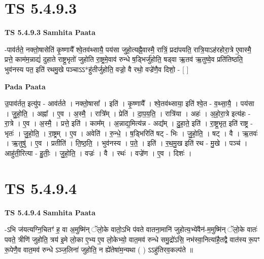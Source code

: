\documentclass[17pt]{extarticle}
\begin{document}
\section*{ TS 5.4.9.3 }

\textbf{TS 5.4.9.3 } \newline
\textbf{Samhita Paata} \newline

-पाव॑र्तते॒ नक्तो॒षासेति॑ कृ॒ष्णायै᳚ श्वे॒तव॑थ्सायै॒ पय॑सा जुहो॒त्यह्नै॒वास्मै॒ रात्रिं॒ प्रदा॑पयति॒ रात्रि॒याऽह॑रहोरा॒त्रे ए॒वास्मै॒ प्रत्ते॒ काम॑म॒न्नाद्यं॑ दुहाते राष्ट्र॒भृतो॑ जुहोति रा॒ष्ट्रमे॒वाव॑ रुन्धे ष॒ड्भिर्जु॑होति॒ षड्वा ऋ॒तव॑ ऋ॒तुष्वे॒व प्रति॑तिष्ठति॒ भुव॑नस्य पत॒ इति॑ रथमु॒खे पञ्चाऽऽ*हु॑तीर्जुहोति॒ वज्रो॒ वै रथो॒ वज्रे॑णै॒व दिशो॒ - [  ] \newline

\textbf{Pada Paata} \newline

उ॒पाव॑र्तत॒ इत्यु॑प - आव॑र्तते । नक्तो॒षासा᳚ । इति॑ । कृ॒ष्णायै᳚ । श्वे॒तव॑थ्साया॒ इति॑ श्वे॒त - व॒थ्सा॒यै॒ । पय॑सा । जु॒हो॒ति॒ । अह्ना᳚ । ए॒व । अ॒स्मै॒ । रात्रि᳚म् । प्रेति॑ । दा॒प॒य॒ति॒ । रात्रि॑या । अहः॑ । अ॒हो॒रा॒त्रे इत्य॑हः - रा॒त्रे । ए॒व । अ॒स्मै॒ । प्रत्ते॒ इति॑ । काम᳚म् । अ॒न्नाद्य॒मित्य॑न्न - अद्य᳚म् । दु॒हा॒ते॒ इति॑ । रा॒ष्ट्र॒भृत॒ इति॑ राष्ट्र - भृतः॑ । जु॒हो॒ति॒ । रा॒ष्ट्रम् । ए॒व । अवेति॑ । रु॒न्धे॒ । ष॒ड्भिरिति॑ षट् - भिः । जु॒हो॒ति॒ । षट् । वै । ऋ॒तवः॑ । ऋ॒तुषु॑ । ए॒व । प्रतीति॑ । ति॒ष्ठ॒ति॒ । भुव॑नस्य । प॒ते॒ । इति॑ । र॒थ॒मु॒ख इति॑ रथ - मु॒खे । पञ्च॑ । आहु॑ती॒रित्या - हु॒तीः॒ । जु॒हो॒ति॒ । वज्रः॑ । वै । रथः॑ । वज्रे॑ण । ए॒व । दिशः॑ ।  \newline




\section*{ TS 5.4.9.4 }

\textbf{TS 5.4.9.4 } \newline
\textbf{Samhita Paata} \newline

-ऽभि ज॑यत्यग्नि॒चितꣳ॑ ह॒ वा अ॒मुष्मि॑न् ॅलो॒के वातो॒ऽभि प॑वते वातना॒मानि॑ जुहोत्य॒भ्ये॑वैन॑-म॒मुष्मि॑न् ॅलो॒के वातः॑ पवते॒ त्रीणि॑ जुहोति॒ त्रय॑ इ॒मे लो॒का ए॒भ्य ए॒व लो॒केभ्यो॒ वात॒मव॑ रुन्धे समु॒द्रो॑ऽसि॒ नभ॑स्वा॒नित्या॑है॒तद्वै वात॑स्य रू॒पꣳ रू॒पेणै॒व वात॒मव॑ रुन्धे ऽञ्ज॒लिना॑ जुहोति॒ न ह्ये॑तेषा॑म॒न्यथा ( ) ऽऽहु॑तिरव॒कल्प॑ते ॥ \newline
\end{document}
